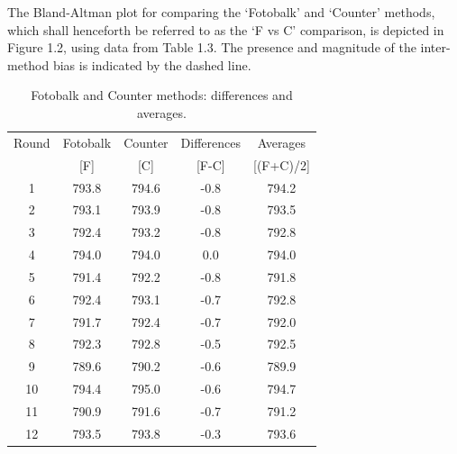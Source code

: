 \documentclass[12pt, a4paper]{report}
\theoremstyle{plain}
\theoremstyle{definition}
\theoremstyle{remark}
\begin{document}
	
	The Bland-Altman plot for comparing the `Fotobalk' and `Counter'
	methods, which shall henceforth be referred to as the `F vs C'
	comparison,  is depicted in Figure 1.2, using data from Table 1.3.
	The presence and magnitude of the inter-method bias is indicated
	by the dashed line.
	
	
	\begin{table}[h!]
		\renewcommand\arraystretch{0.7}%
		\begin{center}
			\begin{tabular}{|c||c|c||c|c|}
				\hline
				Round & Fotobalk  & Counter  & Differences  & Averages  \\
				&  [F] & [C] & [F-C] &  [(F+C)/2] \\
				\hline
				1 & 793.8 & 794.6 & -0.8 & 794.2 \\
				2 & 793.1 & 793.9 & -0.8 & 793.5 \\
				3 & 792.4 & 793.2 & -0.8 & 792.8 \\
				4 & 794.0 & 794.0 & 0.0 & 794.0 \\
				5 & 791.4 & 792.2 & -0.8 & 791.8 \\
				6 & 792.4 & 793.1 & -0.7 & 792.8 \\
				7 & 791.7 & 792.4 & -0.7 & 792.0 \\
				8 & 792.3 & 792.8 & -0.5 & 792.5 \\
				9 & 789.6 & 790.2 & -0.6 & 789.9 \\
				10 & 794.4 & 795.0 & -0.6 & 794.7 \\
				11 & 790.9 & 791.6 & -0.7 & 791.2 \\
				12 & 793.5 & 793.8 & -0.3 & 793.6 \\
				\hline
			\end{tabular}
			\caption{Fotobalk and Counter methods: differences and averages.}
		\end{center}
	\end{table}
	
\end{document}
